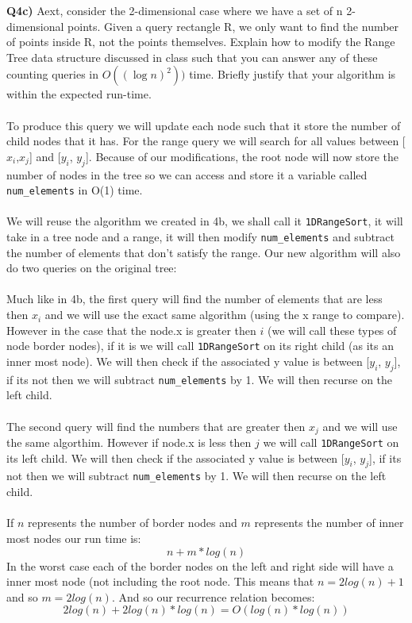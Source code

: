\documentclass[12pt]{article}
\begin{document}
\newpage
\begin{adjustwidth}{0em}{0pt}
\textbf{Q4c)} Aext, consider the 2-dimensional case where we have a set of n 2-dimensional points.
Given a query rectangle R, we only want to find the number of points inside R, not
the points themselves. Explain how to modify the Range Tree data structure discussed
in class such that you can answer any of these counting queries in $O((\log n)^2))$ time.
Briefly justify that your algorithm is within the expected run-time. \\\\
To produce this query we will update each node such that it store the number of child nodes that it has. For the range query we will search for all values between [$x_i$,$x_j$] and [$y_i$, $y_j$]. Because of our modifications, the root node will now store the number of nodes in the tree so we can access and store it a variable called {\tt num\_elements} in O(1) time.\\\\ We will reuse the algorithm we created in 4b, we shall call it {\tt 1DRangeSort}, it will take in a tree node and a range, it will then modify {\tt num\_elements} and subtract the number of elements that don't satisfy the range. Our new algorithm will also do two queries on the original tree:\\\\
Much like in 4b, the first query will find the number of elements that are less then $x_i$ and we will use the exact same algorithm (using the x range to compare). However in the case  that the node.x is greater then $i$ (we will call these types of node border nodes), if it is we will call {\tt 1DRangeSort} on its right child (as its an inner most node). We will then check if the associated y value is between [$y_i$, $y_j$], if its not then we will subtract {\tt num\_elements} by 1. We will then recurse on the left child.\\\\
The second query will find the numbers that are greater then $x_j$ and we will use the same algorthim. However if node.x is less then $j$ we will call {\tt 1DRangeSort} on its left child. We will then check if the associated y value is between [$y_i$, $y_j$], if its not then we will subtract {\tt num\_elements} by 1. We will then recurse on the left child.\\\\
If $n$ represents the number of border nodes and $m$ represents the number of inner most nodes our run time is:
\[ n + m*log(n) \]
In the worst case each of the border nodes on the left and right side will have a inner most node (not including the root node. This means that $n = 2log(n) + 1$ and so $m=2log(n)$. And so our recurrence relation becomes:
\[ 2log(n) + 2log(n)*log(n) = O(log(n)*log(n)) \]
\end{adjustwidth} 
\end{document}
